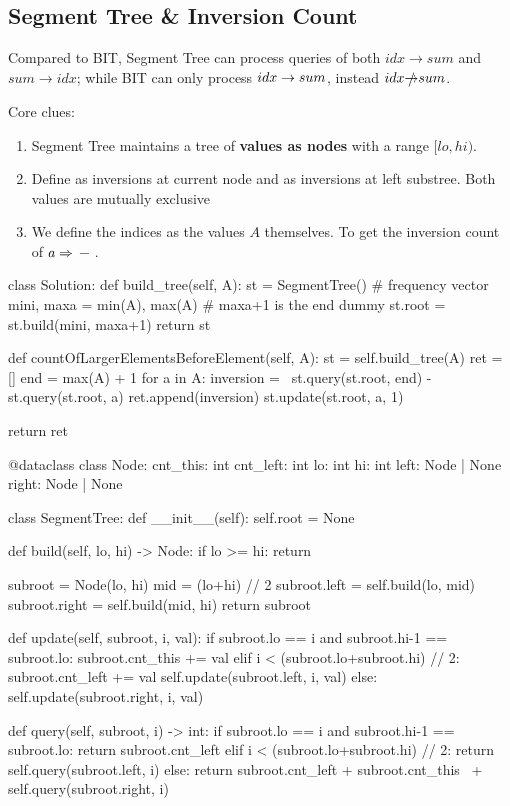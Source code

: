 \subsection{Segment Tree \& Inversion Count}\label{segmentTreeInversionCount}
Compared to BIT, Segment Tree can process queries of both $idx \rightarrow sum$ and $sum \rightarrow idx$; while BIT can only process $idx \rightarrow sum$, instead $idx \slashed{\rightarrow} sum$.

Core clues:
\begin{enumerate}
\item Segment Tree maintains a tree of \textbf{values as nodes} with a range $[lo, hi)$.
\item Define  as inversions at current node and  as inversions at left substree. Both values are mutually exclusive
\item We define the indices as the values $A$ themselves. To get the inversion count of $a \Rightarrow$  $-$ .
\end{enumerate}
\begin{python}
class Solution:
  def build_tree(self, A):
    st = SegmentTree()  # frequency vector
    mini, maxa = min(A), max(A)
    # maxa+1 is the end dummy
    st.root = st.build(mini, maxa+1) 
    return st

  def countOfLargerElementsBeforeElement(self, A):
    st = self.build_tree(A)
    ret = []
    end = max(A) + 1
    for a in A:
      inversion = \
        st.query(st.root, end) - st.query(st.root, a)
      ret.append(inversion)
      st.update(st.root, a, 1)

    return ret

@dataclass
class Node:
    cnt_this: int
    cnt_left: int
    lo: int
    hi: int
    left: Node | None
    right: Node | None

class SegmentTree:
  def __init__(self):
    self.root = None

  def build(self, lo, hi) -> Node:
    if lo >= hi:
      return
    
    subroot = Node(lo, hi)
    mid = (lo+hi) // 2
    subroot.left = self.build(lo, mid)
    subroot.right = self.build(mid, hi)
    return subroot

  def update(self, subroot, i, val):
    if subroot.lo == i and subroot.hi-1 == subroot.lo:
      subroot.cnt_this += val
    elif i < (subroot.lo+subroot.hi) // 2:
      subroot.cnt_left += val
      self.update(subroot.left, i, val)
    else:
      self.update(subroot.right, i, val)

  def query(self, subroot, i) -> int:
    if subroot.lo == i and subroot.hi-1 == subroot.lo:
      return subroot.cnt_left
    elif i < (subroot.lo+subroot.hi) // 2:
      return self.query(subroot.left, i)
    else:
      return subroot.cnt_left + subroot.cnt_this \
        + self.query(subroot.right, i)
\end{python}

